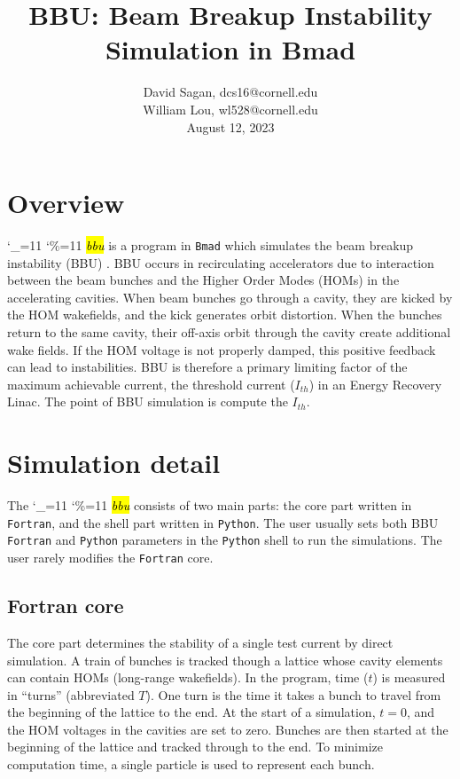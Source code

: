 \documentclass{hitec}
\title{BBU: Beam Breakup Instability Simulation in Bmad}
\author{}
\date{David Sagan, dcs16@cornell.edu \\
William Lou, wl528@cornell.edu \\
August 12, 2023}
\newcommand\dottcmd[1]{\hl{\em#1}\endgroup}
\newcommand{\vn}{\begingroup\catcode`\_=11 \catcode`\%=11 \dottcmd}
\newcommand{\bbu}{\vn{bbu}\xspace}
\begin{document}
\maketitle

\section{Overview}

\bbu is a program in \texttt{Bmad} which simulates the beam breakup instability (BBU) \cite{Bmad}. BBU occurs in recirculating accelerators due to interaction between the beam bunches and the Higher Order Modes (HOMs) in the accelerating cavities. When beam bunches go through a cavity, they are kicked by the HOM wakefields, and the kick generates orbit distortion. When the bunches return to the same cavity, their off-axis orbit through the cavity create additional wake fields. If the HOM voltage is not properly damped, this positive feedback can lead to instabilities. BBU is therefore a primary limiting factor of the maximum achievable current, the threshold current ($I_{th}$) in an Energy Recovery Linac. The point of BBU simulation is compute the $I_{th}$.

\section{Simulation detail}

The \bbu consists of two main parts: the core part written in \texttt{Fortran}, and the shell part written in \texttt{Python}. The user usually sets both BBU \texttt{Fortran} and \texttt{Python} parameters in the \texttt{Python} shell to run the simulations. The user rarely modifies the \texttt{Fortran} core. 

\subsection{Fortran core}
The core part determines the stability of a single test current by direct simulation. A train of bunches is tracked though a lattice whose cavity elements can contain HOMs (long-range wakefields). In the program, time ($t$) is measured in “turns” (abbreviated $T$). One turn is the time it
takes a bunch to travel from the beginning of the lattice to the end. At the start of a simulation, $t=0$, and the HOM voltages in the cavities are set to zero. Bunches are then started at
the beginning of the lattice and tracked through to the end. To minimize computation time, a single particle is used to represent each bunch.
\end{document}
